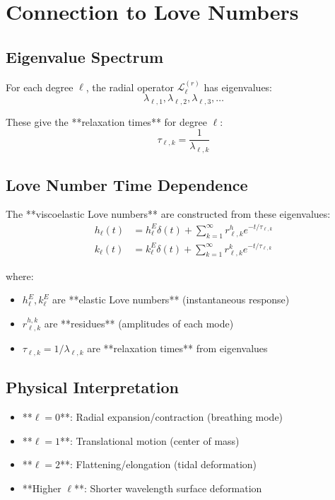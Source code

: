 \documentclass{article}
\begin{document}
\section{Connection to Love Numbers}

\subsection{Eigenvalue Spectrum}

For each degree $\ell$, the radial operator $\mathcal{L}_\ell^{(r)}$ has eigenvalues:
\begin{equation}
\lambda_{\ell,1}, \lambda_{\ell,2}, \lambda_{\ell,3}, \ldots
\end{equation}

These give the **relaxation times** for degree $\ell$:
\begin{equation}
\tau_{\ell,k} = \frac{1}{\lambda_{\ell,k}}
\end{equation}

\subsection{Love Number Time Dependence}

The **viscoelastic Love numbers** are constructed from these eigenvalues:
\begin{align}
h_\ell(t) &= h_\ell^E \delta(t) + \sum_{k=1}^{\infty} r_{\ell,k}^h e^{-t/\tau_{\ell,k}} \\
k_\ell(t) &= k_\ell^E \delta(t) + \sum_{k=1}^{\infty} r_{\ell,k}^k e^{-t/\tau_{\ell,k}}
\end{align}

where:
\begin{itemize}
\item $h_\ell^E, k_\ell^E$ are **elastic Love numbers** (instantaneous response)
\item $r_{\ell,k}^{h,k}$ are **residues** (amplitudes of each mode)
\item $\tau_{\ell,k} = 1/\lambda_{\ell,k}$ are **relaxation times** from eigenvalues
\end{itemize}

\subsection{Physical Interpretation}

\begin{itemize}
\item **$\ell = 0$**: Radial expansion/contraction (breathing mode)
\item **$\ell = 1$**: Translational motion (center of mass)
\item **$\ell = 2$**: Flattening/elongation (tidal deformation)
\item **Higher $\ell$**: Shorter wavelength surface deformation
\end{itemize}
\end{document}

